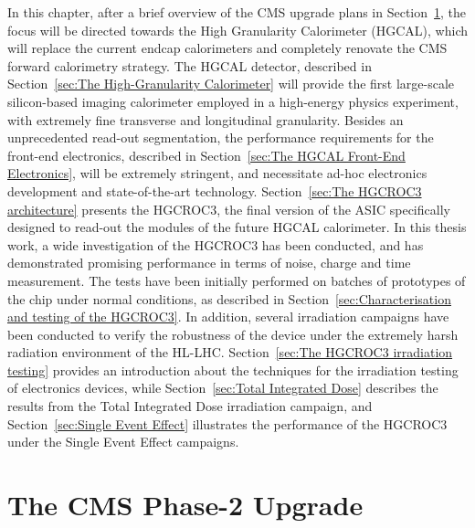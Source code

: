 \bigbreak

In this chapter, after a brief overview of the CMS upgrade plans in Section~\ref{sec:Upgrades of the CMS detector}, the focus will be directed towards the High Granularity Calorimeter (HGCAL), which will replace the current endcap calorimeters and completely renovate the CMS forward calorimetry strategy. 
The HGCAL detector, described in Section~\ref{sec:The High-Granularity Calorimeter} will provide the first large-scale silicon-based imaging calorimeter employed in a high-energy physics experiment, with extremely fine transverse and longitudinal granularity. 
Besides an unprecedented read-out segmentation, the performance requirements for the front-end electronics, described in Section~\ref{sec:The HGCAL Front-End Electronics}, will be extremely stringent, and necessitate ad-hoc electronics development and state-of-the-art technology.
Section~\ref{sec:The HGCROC3 architecture} presents the HGCROC3, the final version of the ASIC specifically designed to read-out the modules of the future HGCAL calorimeter. 
In this thesis work, a wide investigation of the HGCROC3 has been conducted, and has demonstrated promising performance in terms of noise, charge and time measurement. The tests have been initially performed on batches of prototypes of the chip under normal conditions, as described in Section~\ref{sec:Characterisation and testing of the HGCROC3}. In addition, several irradiation campaigns have been conducted to verify the robustness of the device under the extremely harsh radiation environment of the HL-LHC. Section~\ref{sec:The HGCROC3 irradiation testing} provides an introduction about the techniques for the irradiation testing of electronics devices, while Section~\ref{sec:Total Integrated Dose} describes the results from the Total Integrated Dose irradiation campaign, and Section~\ref{sec:Single Event Effect} illustrates the performance of the HGCROC3 under the Single Event Effect campaigns.


\section{The CMS Phase-2 Upgrade}
\label{sec:Upgrades of the CMS detector}

